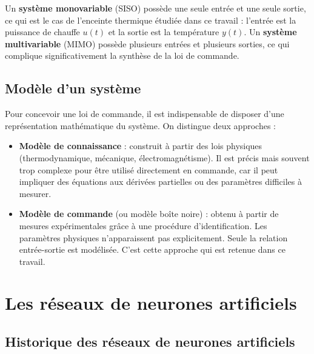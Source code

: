 Un \textbf{système monovariable} (SISO) possède une seule entrée et
une seule sortie, ce qui est le cas de l'enceinte thermique étudiée
dans ce travail : l'entrée est la puissance de chauffe $u(t)$ et la
sortie est la température $y(t)$. Un \textbf{système multivariable}
(MIMO) possède plusieurs entrées et plusieurs sorties, ce qui
complique significativement la synthèse de la loi de commande.

\subsection{Modèle d'un système}

Pour concevoir une loi de commande, il est indispensable de disposer
d'une représentation mathématique du système. On distingue deux
approches :

\begin{itemize}[label=$\bullet$]
	
	\item \textbf{Modèle de connaissance} : construit à partir des lois
	physiques (thermodynamique, mécanique, électromagnétisme).
	Il est précis mais souvent trop complexe pour être utilisé
	directement en commande, car il peut impliquer des équations
	aux dérivées partielles ou des paramètres difficiles à mesurer.
	
	\item \textbf{Modèle de commande} (ou modèle boîte noire) : obtenu à partir de mesures expérimentales grâce à une procédure d'identification. Les paramètres physiques
	n'apparaissent pas explicitement. Seule la relation
	entrée-sortie est modélisée. C'est cette approche qui est
	retenue dans ce travail.
\end{itemize}

\section{Les réseaux de neurones artificiels}

\subsection{Historique des réseaux de neurones artificiels}

